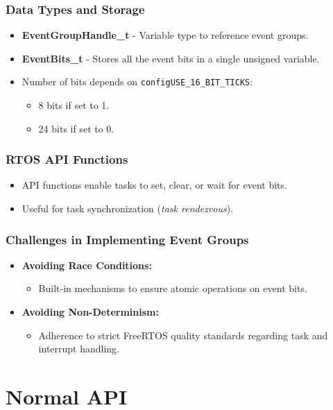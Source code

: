 \documentclass[10pt]{beamer}
\begin{document}
  \begin{frame}
    \frametitle{Data Types and Storage}
    \begin{itemize}
      \item \textbf{EventGroupHandle\_t} - Variable type to reference event groups.
      \item \textbf{EventBits\_t} - Stores all the event bits in a single unsigned variable.
      \item Number of bits depends on \texttt{configUSE\_16\_BIT\_TICKS}:
      \begin{itemize}
        \item 8 bits if set to 1.
        \item 24 bits if set to 0.
      \end{itemize}
    \end{itemize}
  \end{frame}
  
  \begin{frame}
    \frametitle{RTOS API Functions}
    \begin{itemize}
      \item API functions enable tasks to set, clear, or wait for event bits.
      \item Useful for task synchronization (\textit{task rendezvous}).
    \end{itemize}
  \end{frame}
  
  \begin{frame}
    \frametitle{Challenges in Implementing Event Groups}
    \begin{itemize}
      \item \textbf{Avoiding Race Conditions:}
      \begin{itemize}
        \item Built-in mechanisms to ensure atomic operations on event bits.
      \end{itemize}
      \item \textbf{Avoiding Non-Determinism:}
      \begin{itemize}
        \item Adherence to strict FreeRTOS quality standards regarding task and interrupt handling.
      \end{itemize}
    \end{itemize}
  \end{frame}

\section{Normal API}
\end{document}

